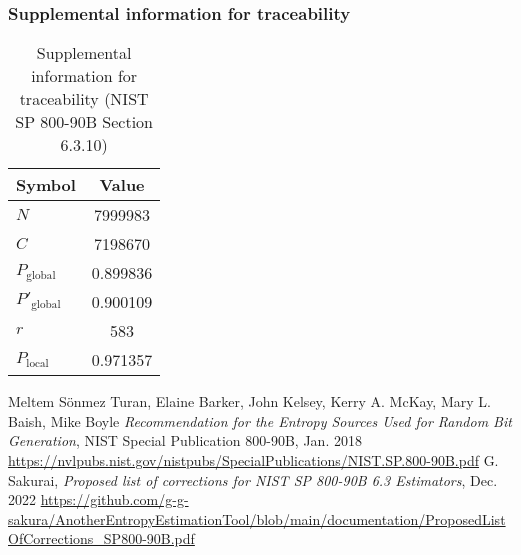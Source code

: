 \documentclass[a3paper,xelatex,english]{bxjsarticle}
\begin{document}
\subsubsection{Supplemental information for traceability}
\renewcommand{\arraystretch}{1.8}
\begin{table}[h]
\caption{Supplemental information for traceability (NIST SP 800-90B Section 6.3.10)}
\begin{center}
\begin{tabular}{|l|c|}
\hline 
\rowcolor{anotherlightblue} %
Symbol				& Value \\ \hline 
$N$				& 7999983\\ \hline 
$C$				& 7198670\\ \hline 
$P_{\textrm{global}}$				& 0.899836\\ \hline 
$P'_{\textrm{global}}$			& 0.900109\\ \hline 
$r$				& 583\\ \hline 
$P_{\textrm{local}}$ 			& 0.971357\\ \hline
\end{tabular}
\end{center}
\end{table}
\renewcommand{\arraystretch}{1.4}
\begin{thebibliography}{99}
Meltem S\"{o}nmez Turan,
Elaine Barker,
John Kelsey,
Kerry A. McKay,
Mary L. Baish,
Mike Boyle
\textit{Recommendation for the Entropy Sources Used for Random Bit Generation},
NIST Special Publication 800-90B, Jan. 2018 
\url{https://nvlpubs.nist.gov/nistpubs/SpecialPublications/NIST.SP.800-90B.pdf}
G. Sakurai, \textit{Proposed list of corrections for NIST SP 800-90B 6.3 Estimators}, Dec. 2022 
\url{https://github.com/g-g-sakura/AnotherEntropyEstimationTool/blob/main/documentation/ProposedListOfCorrections_SP800-90B.pdf}
\end{thebibliography}
\end{document}
